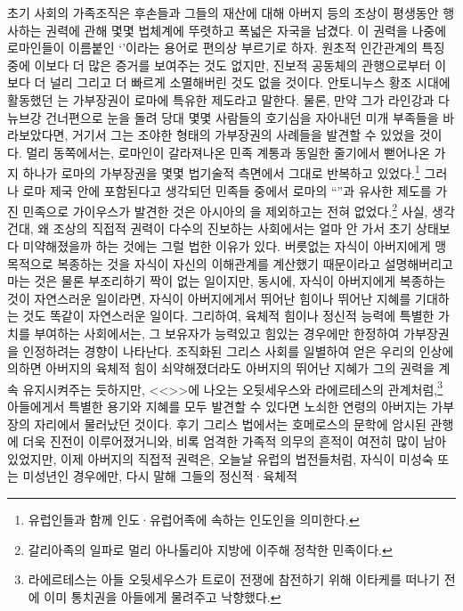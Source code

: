 초기 사회의 가족조직은
후손들과 그들의 재산에 대해
아버지 등의 조상이 평생동안 행사하는 권력에 관해
몇몇 법체계에 뚜렷하고 폭넓은 자국을 남겼다.
이 권력을 나중에 로마인들이 이름붙인
`'이라는 용어로 편의상 부르기로 하자.
원초적 인간관계의 특징 중에 이보다 더 많은 증거를 보여주는 것도 없지만,
진보적 공동체의 관행으로부터 이보다 더 널리 그리고 더 빠르게
소멸해버린 것도 없을 것이다.
안토니누스 황조 시대에 활동했던 는
가부장권이 로마에 특유한 제도라고 말한다.
물론, 만약 그가 라인강과 다뉴브강 건너편으로 눈을 돌려
당대 몇몇 사람들의 호기심을 자아내던 미개 부족들을 바라보았다면,
거기서 그는 조야한 형태의 가부장권의 사례들을 발견할 수 있었을 것이다.
멀리 동쪽에서는, 로마인이 갈라져나온 민족 계통과 동일한 줄기에서
뻗어나온 가지 하나가 로마의 가부장권을 몇몇 법기술적 측면에서
그대로 반복하고 있었다.\footnote{%
  유럽인들과 함께 인도·유럽어족에 속하는 인도인을 의미한다. }
그러나
로마 제국 안에 포함된다고 생각되던 민족들 중에서
로마의 ``''과 유사한 제도를 가진 민족으로
가이우스가
발견한 것은
아시아의 을 제외하고는
전혀 없었다.\footnote{%
  갈리아족의 일파로 멀리 아나톨리아 지방에 이주해 정착한 민족이다. }
사실, 생각건대,
왜 조상의 직접적 권력이
다수의 진보하는 사회에서는
얼마 안 가서 초기 상태보다 미약해졌을까 하는 것에는
그럴 법한 이유가 있다.
버릇없는 자식이 아버지에게 맹목적으로 복종하는 것을
자식이 자신의 이해관계를 계산했기 때문이라고 설명해버리고 마는 것은
물론 부조리하기 짝이 없는 일이지만,
동시에, 자식이 아버지에게 복종하는 것이 자연스러운 일이라면,
자식이 아버지에게서 뛰어난 힘이나 뛰어난 지혜를 기대하는 것도 똑같이
자연스러운 일이다.
그리하여,
육체적 힘이나 정신적 능력에 특별한 가치를 부여하는 사회에서는,
그 보유자가 능력있고 힘있는 경우에만 한정하여
가부장권을
인정하려는 경향이 나타난다.
조직화된 그리스 사회를 일별하여 얻은 우리의 인상에 의하면
아버지의 육체적 힘이 쇠약해졌더라도 아버지의 뛰어난 지혜가
그의 권력을 계속 유지시켜주는 듯하지만,
<<>>에 나오는
오뒷세우스와 라에르테스의 관계처럼,\footnote{%
  라에르테스는 아들 오뒷세우스가 트로이 전쟁에 참전하기 위해
  이타케를 떠나기 전에 이미 통치권을 아들에게 물려주고 낙향했다.}
아들에게서 특별한 용기와 지혜를 모두 발견할 수 있다면
노쇠한 연령의 아버지는 가부장의 자리에서 물러났던 것이다.
후기 그리스 법에서는
호메로스의 문학에 암시된 관행에 더욱 진전이 이루어졌거니와,
비록 엄격한 가족적 의무의 흔적이 여전히 많이 남아있었지만,
이제 아버지의 직접적 권력은, 오늘날 유럽의 법전들처럼,
자식이 미성숙 또는 미성년인 경우에만, 다시 말해 그들의 정신적·육체적
